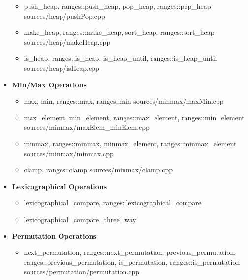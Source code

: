 \documentclass{article}
\begin{document}
\begin{itemize}
          \begin{itemize}
            \item push\_heap, ranges::push\_heap, pop\_heap, ranges::pop\_heap
               {sources/heap/pushPop.cpp}
            \item make\_heap, ranges::make\_heap, sort\_heap, ranges::sort\_heap
               {sources/heap/makeHeap.cpp}
            \item is\_heap, ranges::is\_heap, is\_heap\_until, ranges::is\_heap\_until
               {sources/heap/isHeap.cpp}
          \end{itemize}
        \item \textbf{Min/Max Operations}
          \begin{itemize}
            \item max, min, ranges::max, ranges::min
               {sources/minmax/maxMin.cpp}
            \item max\_element, min\_element, ranges::max\_element, ranges::min\_element
               {sources/minmax/maxElem_minElem.cpp}
            \item minmax, ranges::minmax, minmax\_element, ranges::minmax\_element
               {sources/minmax/minmax.cpp}
            \item clamp, ranges::clamp
               {sources/minmax/clamp.cpp}
          \end{itemize}
        \item \textbf{Lexicographical Operations}
          \begin{itemize}
            \item lexicographical\_compare, ranges::lexicographical\_compare
            \item lexicographical\_compare\_three\_way
          \end{itemize}
        \item \textbf{Permutation Operations}
          \begin{itemize}
            \item next\_permutation, ranges::next\_permutation, previous\_permutation, \\
              ranges::previous\_permutation, is\_permutation, ranges::is\_permutation
               {sources/permutation/permutation.cpp}
          \end{itemize}

\end{itemize}
\end{document}
